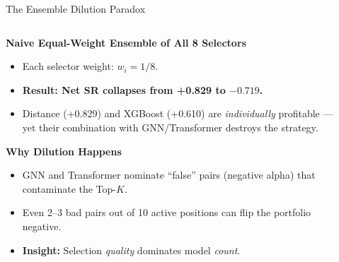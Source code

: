 \documentclass[aspectratio=169,10pt]{beamer}
\begin{document}
\begin{frame}{The Ensemble Dilution Paradox}
  \vspace{2pt}
  \begin{columns}[T]
    \begin{column}{0.52\textwidth}
      \textbf{Naive Equal-Weight Ensemble of All 8 Selectors}
      \begin{itemize}\itemsep4pt
        \item Each selector weight: $w_i = 1/8$.
        \item \alert{\textbf{Result: Net SR collapses from +0.829 to $-0.719$.}}
        \item Distance (+0.829) and XGBoost (+0.610) are \emph{individually} profitable --- yet their combination with GNN/Transformer destroys the strategy.
      \end{itemize}
      \vspace{5pt}
      \textbf{Why Dilution Happens}
      \begin{itemize}\itemsep4pt
        \item GNN and Transformer nominate ``false'' pairs (negative alpha) that contaminate the Top-$K$.
        \item Even 2--3 bad pairs out of 10 active positions can flip the portfolio negative.
        \item \textbf{Insight:} Selection \emph{quality} dominates model \emph{count}.
      \end{itemize}
    \end{column}
    \begin{column}{0.45\textwidth}
      \vspace{4pt}
      \begin{center}
      \resizebox{\columnwidth}{!}{%
      \begin{tikzpicture}[x=1cm,y=1cm]
        \begin{axis}[
          ybar, ymin=-1.0, ymax=1.1,
          width=7.5cm, height=6cm,
          bar width=0.5cm,
          symbolic x coords={Dist,XGB,EqWt,Corr+Coint,Cfg-C},
          xtick=data,
          xticklabels={Distance,XGBoost,EqWt All,Corr+Coint,Config C},
          xticklabel style={font=\tiny,rotate=25,anchor=east},
          ytick={-1.0,-0.5,0,0.5,1.0},
          yticklabel style={font=\tiny},
          ymajorgrids=true, grid style={dashed,gray!25},
          axis line style={gray!50}, tick style={gray!50},
          title={\scriptsize Key Net Sharpe Comparisons},

\end{axis}
\end{tikzpicture}}
\end{center}
\end{column}
\end{columns}
\end{frame}
\end{document}

